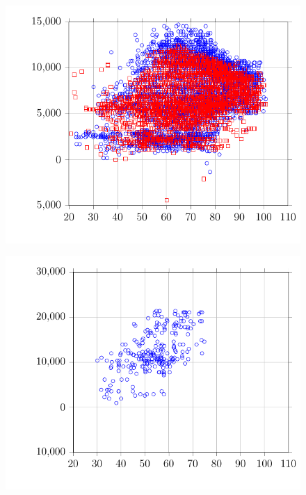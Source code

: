 \begin{figure}
\centering
\includegraphics{Plots/23/2017-06-27-1346-BtuhrvsOADryBulbTemperatureNOAAF.pdf}
\caption{}
\label{fig:2017-06-27-1346-BtuhrvsOADryBulbTemperatureNOAAF}
\end{figure}

\begin{figure}
\centering
\includegraphics{Plots/24/2017-06-27-1348-BtuhrvsOADryBulbTemperatureNOAAF.pdf}
\caption{}
\label{fig:2017-06-27-1348-BtuhrvsOADryBulbTemperatureNOAAF}
\end{figure}

